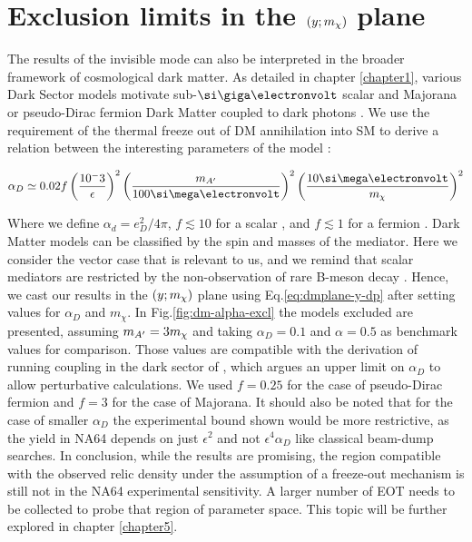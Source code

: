\FloatBarrier
\section{Exclusion limits in the $(y;m_{\chi})$ plane}
\label{ch4:sec:exclusion-limits-y}

The results of the invisible mode can also be interpreted in the broader framework of cosmological dark matter. As detailed in chapter \ref{chapter1}, various Dark Sector models motivate sub-$\gev$ scalar and Majorana or pseudo-Dirac fermion Dark Matter coupled to dark photons \cite{battaglieri2017cosmic}. We use the requirement of the thermal freeze out of DM annihilation into SM to derive a relation between the interesting parameters of the model \cite{na64-prd}:

\begin{equation}
  \label{eq:ad-freeze-out}
  \alpha_D \simeq 0.02 f\left(\frac{10^-3}{\epsilon}\right)^2\left(\frac{m_{\DM}}{100 \mev}\right)^2\left(\frac{10 \mev}{m_{\chi}}\right)^2
\end{equation}

Where we define $\alpha_d = e^2_D/4\pi$, $f\lesssim 10$ for a scalar \cite{deNiverville:2011it}, and $f\lesssim 1$ for a fermion \cite{PhysRevD.91.094026}. Dark Matter models can be classified by the spin and masses of the mediator. Here we consider the vector case that is relevant to us, and we remind that scalar mediators are restricted by the non-observation of rare B-meson decay \cite{battaglieri2017cosmic}. Hence, we cast our results in the $(y;m_{\chi})$ plane using Eq.\ref{eq:dmplane-y-dp} after setting values for $\alpha_D$ and $m_{\chi}$. In Fig.\ref{fig:dm-alpha-excl} the models excluded are presented, assuming $m_{A'} = 3m_{\chi}$ and taking $\alpha_D=0.1$ and $\alpha=0.5$ as benchmark values for comparison. Those values are compatible with the derivation of running coupling in the dark sector of \cite{Davoudiasl:2015hxa}, which argues an upper limit on $\alpha_D$ to allow perturbative calculations. We used $f=0.25$ for the case of pseudo-Dirac fermion and $f=3$ for the case of Majorana. It should also be noted that for the case of smaller $\alpha_D$ the experimental bound shown would be more restrictive, as the yield in NA64 depends on just $\epsilon^2$ and not $\epsilon^4 \alpha_D$ like classical beam-dump searches. In conclusion, while the results are promising, the region compatible with the observed relic density under the assumption of a freeze-out mechanism is still not in the NA64 experimental sensitivity. A larger number of EOT needs to be collected to probe that region of parameter space. This topic will be further explored in chapter \ref{chapter5}.

